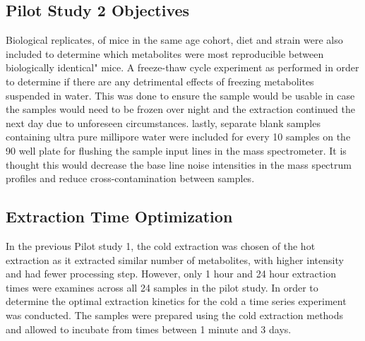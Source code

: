 \documentclass[a4paper]{book}
\begin{document}
	\subsection*{Pilot Study 2 Objectives}
	 
	Biological replicates, of mice in the same age cohort, diet and strain were also included to determine which metabolites were most reproducible between biologically identical" mice.  A freeze-thaw cycle experiment as performed in order to determine if there are any detrimental effects of freezing metabolites suspended in water. This was done to ensure the sample would be usable in case the samples would need to be frozen over night and the extraction continued the next day due to unforeseen circumstances. lastly, separate blank samples containing ultra pure millipore water were included for every 10 samples on the 90 well plate for flushing the sample input lines in the mass spectrometer. It is thought this would decrease the base line noise intensities in the mass spectrum profiles and reduce cross-contamination between samples.
	
	\subsection*{Extraction Time Optimization}
	
	In the previous Pilot study 1, the cold extraction was chosen of the hot extraction as it extracted similar number of metabolites, with higher intensity and had fewer processing step. However, only 1 hour and 24 hour extraction times were examines across all 24 samples in the pilot study. In order to determine the optimal extraction kinetics for the cold a time series experiment was conducted. The samples were prepared using the cold extraction methods and allowed to incubate from times between 1 minute and 3 days.
	
\end{document}
